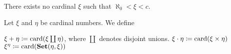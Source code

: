\begin{hypothesis}\label{hyp:continuum_hypothesis}
  There exists no cardinal $\xi$ such that $\aleph_0 < \xi < c$.
\end{hypothesis}

\begin{definition}\label{def:cardinal_arithmetic}
  Let $\xi$ and $\eta$ be cardinal numbers. We define
  \begin{description}
     $\xi + \eta \coloneqq \operatorname{card}(\xi \coprod \eta)$, where $\coprod$ denotes disjoint unions.
     $\xi \cdot \eta \coloneqq \operatorname{card}(\xi \times \eta)$
     $\xi^\eta \coloneqq \operatorname{card}(\operatorname{\mathbf{Set}}(\eta, \xi))$
  \end{description}
\end{definition}

